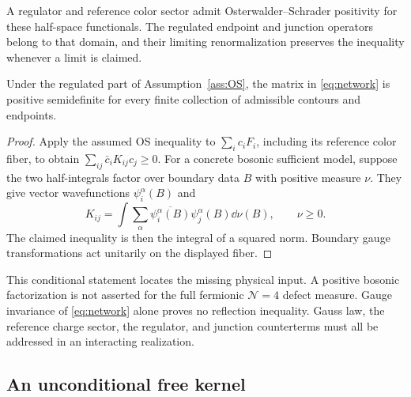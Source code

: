 \begin{assumption}\label{ass:OS}
A regulator and reference color sector admit Osterwalder--Schrader
positivity for these half-space functionals. The regulated endpoint
and junction operators belong to that domain, and their limiting
renormalization preserves the inequality whenever a limit is claimed.
\end{assumption}

\begin{proposition}\label{prop:conditional-gram}
Under the regulated part of Assumption~\ref{ass:OS}, the matrix
in \eqref{eq:network} is positive semidefinite for every finite
collection of admissible contours and endpoints.
\end{proposition}
\begin{proof}
Apply the assumed OS inequality to $\sum_i c_iF_i$, including its
reference color fiber, to obtain $\sum_{ij}\bar c_iK_{ij}c_j\geq0$.
For a concrete bosonic sufficient model, suppose the two half-integrals
factor over boundary data $B$ with positive measure $\nu$. They give
vector wavefunctions $\psi_i^\alpha(B)$ and
\begin{equation}\label{eq:factorized-gram}
 K_{ij}=\int\sum_\alpha\overline{\psi_i^\alpha(B)}
                    \psi_j^\alpha(B)\dd\nu(B),\qquad\nu\geq0.
\end{equation}
The claimed inequality is then the integral of a squared norm.
Boundary gauge transformations act unitarily on the displayed fiber.
\end{proof}

This conditional statement locates the missing physical input. A
positive bosonic factorization is not asserted for the full fermionic
$\mathcal N=4$ defect measure. Gauge invariance of
\eqref{eq:network} alone proves no reflection inequality. Gauss law,
the reference charge sector, the regulator, and junction counterterms
must all be addressed in an interacting realization.

\subsection{An unconditional free kernel}

